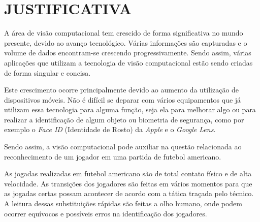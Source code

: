 \section{JUSTIFICATIVA}

A área de visão computacional tem crescido de forma significativa no mundo presente, devido ao avanço tecnológico. Várias informações são capturadas e o volume de dados encontram-se crescendo progressivamente. Sendo assim, várias aplicações que utilizam a tecnologia de visão computacional estão sendo criadas de forma singular e concisa.

Este crescimento ocorre principalmente devido ao aumento da utilização de dispositivos móveis. Não é difícil se deparar com vários equipamentos que já utilizam essa tecnologia para alguma função, seja ela para melhorar algo ou para realizar a identificação de algum objeto ou biometria de segurança, como por exemplo o \textit{Face ID} (Identidade de Rosto) da \textit{Apple} e o \textit{Google Lens}.

Sendo assim, a visão computacional pode auxiliar na questão relacionada ao reconhecimento de um jogador em uma partida de futebol americano.

As jogadas realizadas em futebol americano são de total contato físico e de alta velocidade. As transições dos jogadores são feitas em vários momentos para que as jogadas certas possam acontecer de acordo com a tática traçada pelo técnico. A leitura dessas substituições rápidas são feitas a olho humano, onde podem ocorrer equívocos e possíveis erros na identificação dos jogadores.